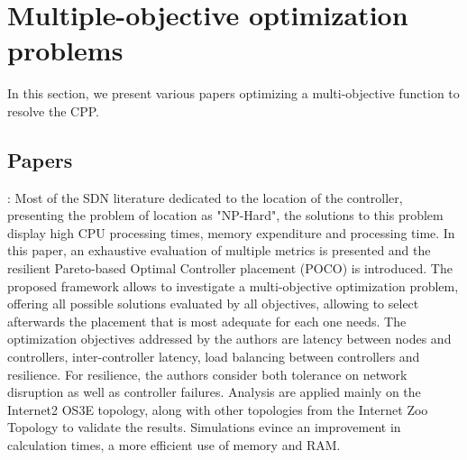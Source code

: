 \documentclass[a4paper,10pt]{article}
\begin{document}
\section{Multiple-objective optimization problems}
In this section, we present various papers optimizing a multi-objective function to resolve the CPP.





\subsection{Papers}

\cite{HoHa13}: Most of the SDN literature dedicated to the location of the controller, presenting the problem of location as "NP-Hard", the solutions to this problem display high CPU processing times, memory expenditure and processing time.
In this paper, an exhaustive evaluation of multiple metrics is presented and the resilient Pareto-based Optimal Controller placement (POCO) is introduced. The proposed framework allows to investigate a multi-objective optimization problem, offering all possible solutions evaluated by all objectives, allowing to select afterwards the placement that is most adequate for each one needs. The optimization objectives addressed by the authors are latency between nodes and controllers, inter-controller latency, load balancing between controllers and resilience. For resilience, the authors consider both tolerance on network disruption as well as controller failures. Analysis are applied mainly on the Internet2 OS3E topology, along with other topologies from the Internet Zoo Topology to validate the results. Simulations evince an improvement in calculation times, a more efficient use of memory and RAM.
\end{document}
